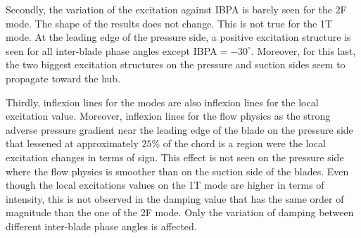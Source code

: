 Secondly, the variation of the excitation against IBPA
is barely seen for the 2F mode. The shape of the
results does not change. This is not true for the
1T mode. At the leading edge of the pressure side,
a positive excitation structure is seen for all inter-blade phase
angles except
\mbox{IBPA$=-30^\circ$}. Moreover, for this last, 
the two biggest excitation structures on the pressure 
and suction sides seem to propagate toward the hub.

Thirdly, inflexion lines
for the modes are also inflexion lines for the local excitation
value. Moreover, inflexion lines for the flow physics as the
strong adverse pressure gradient near the leading edge of the blade
on the pressure side that lessened at approximately $25\%$ of the chord
is a region were the local excitation changes in terms of sign.
This effect is not seen on the pressure side where the flow physics
is smoother than on the suction side of the blades. Even though the
local excitations values on the 1T mode are higher in terms of
intensity, this is not observed in the damping value that
has the same order of magnitude than the one of the 2F mode.
Only the variation of damping between different inter-blade phase angles
is affected.

